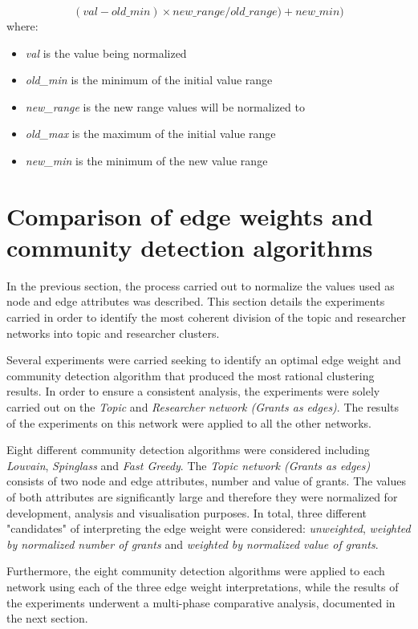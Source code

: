 \begin{equation}
    (val - old\_min) \times new\_range / old\_range) + new\_min)
\end{equation}
where:
\begin{itemize}[itemsep=0cm]
    \item \textit{val} is the value being normalized
    \item \textit{old\_min} is the minimum of the initial value range
    \item \textit{new\_range} is the new range values will be normalized to
    \item \textit{old\_max} is the maximum of the initial value range
    \item \textit{new\_min} is the minimum of the new value range
\end{itemize}

\section{Comparison of edge weights and community detection algorithms}

In the previous section, the process carried out to normalize the values used as node and edge attributes was described. This section details the experiments carried in order to identify the most coherent division of the topic and researcher networks into topic and researcher clusters.

Several experiments were carried seeking to identify an optimal edge weight and community detection algorithm that produced the most rational clustering results. In order to ensure a consistent analysis, the experiments were solely carried out on the \textit{Topic} and \textit{Researcher network (Grants as edges)}. The results of the experiments on this network were applied to all the other networks.

Eight different community detection algorithms were considered including \textit{Louvain}, \textit{Spinglass} and \textit{Fast Greedy}. The \textit{Topic network (Grants as edges)} consists of two node and edge attributes, number and value of grants. The values of both attributes are significantly large and therefore they were normalized for development, analysis and visualisation purposes. In total, three different "candidates" of interpreting the edge weight were considered: \textit{unweighted}, \textit{weighted by normalized number of grants} and \textit{weighted by normalized value of grants}.

Furthermore, the eight community detection algorithms were applied to each network using each of the three edge weight interpretations, while the results of the experiments underwent a multi-phase comparative analysis, documented in the next section.

